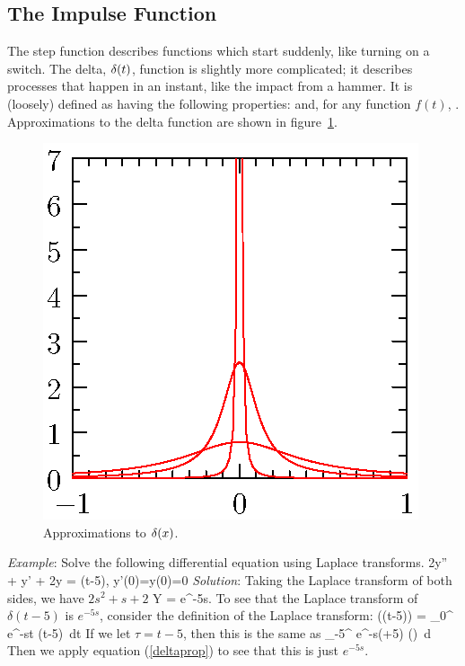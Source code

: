 \documentclass[12pt]{article}
\begin{document}
\subsection{The Impulse Function}
The step function describes functions which start suddenly, like turning on
a switch. The delta, $\delta(t)$,
function is slightly more complicated; it describes processes that happen in an
instant, like the impact from a hammer. It is (loosely) defined as having
the following properties:
\be
{}
\ee
and, for any function $f(t)$,
\be \label{deltaprop}
.
\ee
Approximations to the delta function are shown in figure~\ref{deltafig}.
\begin{figure}[htbp]
  \begin{center}
    \includegraphics{201/delta}
    \caption{Approximations to $\delta(x)$.}
    \label{deltafig}
  \end{center}
\end{figure}


\noindent\emph{Example}: Solve the following differential equation using
Laplace transforms.
\be
2y'' + y' + 2y = \delta(t-5), \qquad y'(0)=y(0)=0
\ee
\emph{Solution}: Taking the Laplace transform of both sides, we have
\be \label{exeq1}
\(2s^2 + s +2\) Y = e^{-5s}.
\ee
To see that the Laplace transform of $\delta(t-5)$ is $e^{-5s}$, consider the 
definition of the Laplace transform:
\be
{}(\delta(t-5)) = \int_0^{\infty} e^{-st} \delta(t-5)\, dt
\ee
If we let $\tau = t-5$, then this is the same as
\be
\int_{-5}^{\infty} e^{-s(\tau+5)} \delta(\tau)\, d\tau
\ee
Then we apply equation (\ref{deltaprop}) to see that this is just $e^{-5s}$. 
\end{document}
